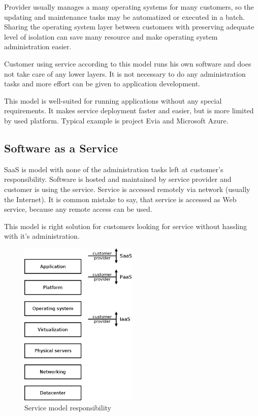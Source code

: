 Provider usually manages a many operating systems for many customers, so the updating and maintenance tasks may be automatized or executed in a batch. Sharing the operating system layer between customers with preserving adequate level of isolation can save many resource and make operating system administration easier.

Customer using service according to this model runs his own software and does not take care of any lower layers. It is not necessary to do any administration tasks and more effort can be given to application development. 

This model is well-suited for running applications without any special requirements. It makes service deployment faster and easier, but is more limited by used platform. 
Typical example is project Evia and Microsoft Azure.

\subsection{Software as a Service}
\Ac{SaaS} is model with none of the administration tasks left at customer's responsibility. Software is hosted and maintained by service provider and customer is using the service. Service is accessed remotely via network (usually the Internet). It is common mistake to say, that service is accessed as Web service, because any remote access can be used. 

This model is right solution for customers looking for service without hassling with it's administration.

\begin{figure}[htb]
	\begin{center}
	\includegraphics[width=0.5\textwidth]{service-models.png}
	\end{center}
	\caption{Service model responsibility}
	\label{img:service-models}
\end{figure}

